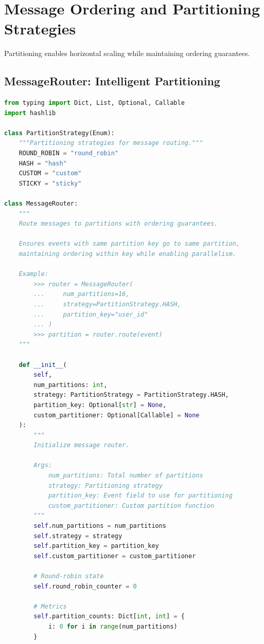 \section{Message Ordering and Partitioning Strategies}

Partitioning enables horizontal scaling while maintaining ordering guarantees.

\subsection{MessageRouter: Intelligent Partitioning}

\begin{lstlisting}[language=Python, caption={Message Router with Partitioning Logic}]
from typing import Dict, List, Optional, Callable
import hashlib

class PartitionStrategy(Enum):
    """Partitioning strategies for message routing."""
    ROUND_ROBIN = "round_robin"
    HASH = "hash"
    CUSTOM = "custom"
    STICKY = "sticky"

class MessageRouter:
    """
    Route messages to partitions with ordering guarantees.

    Ensures events with same partition key go to same partition,
    maintaining ordering within key while enabling parallelism.

    Example:
        >>> router = MessageRouter(
        ...     num_partitions=16,
        ...     strategy=PartitionStrategy.HASH,
        ...     partition_key="user_id"
        ... )
        >>> partition = router.route(event)
    """

    def __init__(
        self,
        num_partitions: int,
        strategy: PartitionStrategy = PartitionStrategy.HASH,
        partition_key: Optional[str] = None,
        custom_partitioner: Optional[Callable] = None
    ):
        """
        Initialize message router.

        Args:
            num_partitions: Total number of partitions
            strategy: Partitioning strategy
            partition_key: Event field to use for partitioning
            custom_partitioner: Custom partition function
        """
        self.num_partitions = num_partitions
        self.strategy = strategy
        self.partition_key = partition_key
        self.custom_partitioner = custom_partitioner

        # Round-robin state
        self.round_robin_counter = 0

        # Metrics
        self.partition_counts: Dict[int, int] = {
            i: 0 for i in range(num_partitions)
        }


\end{lstlisting}
